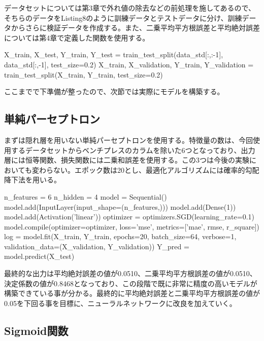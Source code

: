 \documentclass{report}
\begin{document}
データセットについては第3章で外れ値の除去などの前処理を施してあるので、そちらのデータをListing8のように訓練データとテストデータに分け、訓練データからさらに検証データを作成する。また、二乗平均平方根誤差と平均絶対誤差については第4章で定義した関数を使用する。
\\


\begin{python}[caption=訓練データ、テストデータ、検証データを作成する]
X_train, X_test, Y_train, Y_test = 
train_test_split(data_std[:,:-1], data_std[:,-1], test_size=0.2)
X_train, X_validation, Y_train, Y_validation = 
train_test_split(X_train, Y_train, test_size=0.2)
\end{python}


ここまでで下準備が整ったので、次節では実際にモデルを構築する。

\subsection{単純パーセプトロン}

まずは隠れ層を用いない単純パーセプトロンを使用する。特徴量の数は、今回使用するデータセットからベンチプレスのカラムを除いた6つとなっており、出力層には恒等関数、損失関数には二乗和誤差を使用する。この3つは今後の実験においても変わらない。エポック数は20とし、最適化アルゴリズムには確率的勾配降下法を用いる。
\\

\begin{python}[caption=単純パーセプトロン]
n_features = 6
n_hidden   = 4
model = Sequential()
model.add(InputLayer(input_shape=(n_features,)))
model.add(Dense(1))
model.add(Activation('linear'))
optimizer = optimizers.SGD(learning_rate=0.1)
model.compile(optimizer=optimizer,
              loss='mse', metrics=['mae', rmse, r_square])
log = model.fit(X_train, Y_train, epochs=20, batch_size=64, 
verbose=1,
         validation_data=(X_validation, Y_validation))
Y_pred = model.predict(X_test)
\end{python}

最終的な出力は平均絶対誤差の値が0.0510、二乗平均平方根誤差の値が0.0510、決定係数の値が0.8468となっており、この段階で既に非常に精度の高いモデルが構築できている事が分かる。最終的に平均絶対誤差と二乗平均平方根誤差の値が0.05を下回る事を目標に、ニューラルネットワークに改良を加えていく。

\subsection{Sigmoid関数}
\end{document}
